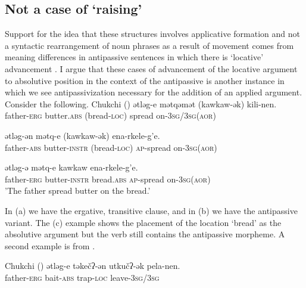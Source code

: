 \documentclass[output=paper,modfonts,nonflat,newtxmath]{langsci/langscibook}
\begin{document}
\subsection{Not a case of ‘raising’} %

Support for the idea that these structures involves applicative formation and not a syntactic rearrangement of noun phrases as a result of movement comes from meaning differences in antipassive sentences in which there is ‘locative’ advancement \citep{PolinskajaNedjalkov1987}. I argue that these cases of advancement of the locative argument to absolutive position in the context of the antipassive is another instance in which we see antipassivization necessary for the addition of an applied argument. Consider the following.
\ea Chukchi (\citealt{PolinskajaNedjalkov1987})   \label{ex:basilico:10}
	\ea \label{ex:basilico:10a}
	\gll ətləg-e  mətqəmət  (kawkaw-ək)  kili-nen.\\
	father-\textsc{\textsc{erg}}  butter.\textsc{\textsc{abs}}  (bread-\textsc{loc})   {spread on}-3\textsc{sg}/3\textsc{sg}(\textsc{\textsc{aor}})\\
	\glt  

	\ex \label{ex:basilico:11b}
	\gll ətləg-ən  mətq-e  (kawkaw-ək)  ena-rkele-g’e.\\
	father-\textsc{\textsc{abs}}  butter-\textsc{\textsc{instr}}  (bread-\textsc{loc})  \textsc{ap}{}-{spread on}-3\textsc{sg}(\textsc{\textsc{aor}})\\
	\glt 

	\ex \label{ex:basilico:11b}
	\gll  ətləg-ə  mətq-e  kawkaw  ena-rkele-g’e.\\
	father-\textsc{\textsc{erg}}  butter-\textsc{\textsc{instr}}  bread.\textsc{\textsc{abs}}  \textsc{ap}{}-{spread on}-3\textsc{sg}(\textsc{\textsc{aor}})\\
	\glt 'The father spread butter on the bread.'
	\z
	\z

In (a) we have the ergative, transitive clause, and in (b) we have the antipassive variant. The (c) example shows the placement of the location ‘bread’ as the absolutive argument but the verb still contains the antipassive morpheme. A second example is from  \citet{KozinskyEtAl1988}.

\ea%
    Chukchi (\citealt{KozinskyEtAl1988}) \label{ex:basilico:11}
    \ea \label{ex:basilico:11a}
    \gll ətləg-e   təkečʔ-ən   utkučʔ-ək   pela-nen.\\
    father-\textsc{\textsc{erg}}   bait-\textsc{\textsc{abs}}   trap-\textsc{loc}   leave-3\textsc{sg}/3\textsc{sg}\\
    \glt  
    
\end{document}
